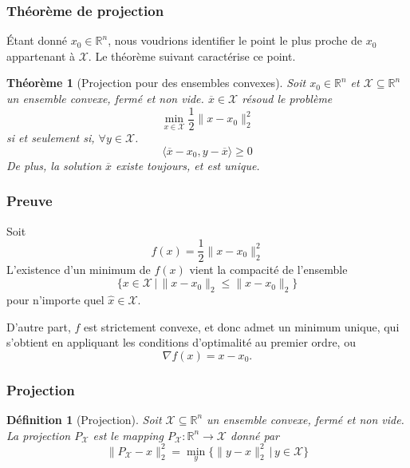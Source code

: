 \documentclass[t,usepdftitle=false]{beamer}
\newtheorem{defn}{Définition}
\newtheorem{thm}{Théorème}
\def\cX{\mathcal{X}}
\begin{document}
\begin{frame}
\frametitle{Théorème de projection}

Étant donné $x_0 \in \mathbb{R}^n$, nous voudrions identifier le point le plus proche de $x_0$ appartenant à $\cX$. Le théorème suivant caractérise ce point.

\begin{thm}[Projection pour des ensembles convexes]
Soit $x_0 \in \mathbb{R}^n$ et $\cX \subseteq \mathbb{R}^n$ un ensemble convexe, fermé et non vide.
$\overline{x} \in \cX$ résoud le problème
$$
\min_{x \in \cX} \frac{1}{2} \| x - x_0 \|_2^2
$$
si et seulement si, $\forall y \in \cX$.
$$
\langle \overline{x} - x_0, y - \overline{x} \rangle \geq 0
$$
De plus, la solution $\overline{x}$ existe toujours, et est unique.
\end{thm}
	
\end{frame}

\begin{frame}
\frametitle{Preuve}

Soit
$$
f(x) = \frac{1}{2} \| x - x_0 \|^2_2
$$
L'existence d'un minimum de $f(x)$ vient la compacité de l'ensemble
$$
\lbrace x \in \cX \,|\, \| x - x_0 \|_2 \leq \| \hat{x} - x_0 \|_2 \rbrace
$$
pour n'importe quel $\hat{x} \in \cX$.

\mbox{}

D'autre part, $f$ est strictement convexe, et donc admet un minimum unique, qui s'obtient en appliquant les conditions d'optimalité au premier ordre, ou
$$
\nabla f(x) = x - x_0.
$$

\end{frame}

\begin{frame}
\frametitle{Projection}

\begin{defn}[Projection]
Soit $\cX \subseteq \mathbb{R}^n$ un ensemble convexe, fermé et non vide.
La projection $P_{\cX}$ est le mapping $P_{\cX}: \mathbb{R}^n \rightarrow \cX$ donné par
$$
\| P_{\cX}-x \|_2^2 = \min_y \lbrace \| y - x \|_2^2 \,|\, y \in \cX \rbrace
$$
\end{defn}

\end{frame}
\end{document}
